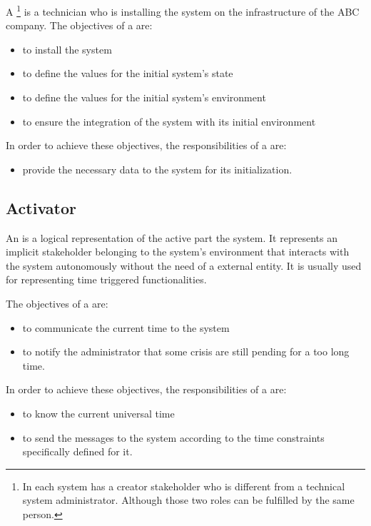 A \footnote{In \msrmessir each system has a creator stakeholder who is different from a technical system administrator. Although those two roles can be fulfilled by the same person.} is a technician who is installing the \msricrash system on the infrastructure of the ABC company.
The objectives of a  are:
\begin{itemize}
  \item to install the \msricrash system
  \item to define the values for the initial system's state
  \item to define the values for the initial system's environment
  \item to ensure the integration of the \msricrash system with its initial environment
\end{itemize}
\vspace{0.5cm}
In order to achieve these objectives, the responsibilities of a  are:
\begin{itemize}
  \item provide the necessary data to the \msricrash system for its initialization.
\end{itemize}

\subsection{Activator}

An  is a logical representation of the active part the \msricrash system. It represents an implicit stakeholder belonging to the system's environment that interacts with the \msricrash system autonomously without the need of a external entity. It is usually used for representing time triggered functionalities.

The objectives of a  are:
\begin{itemize}
  \item to communicate the current time to the system
  \item to notify the administrator that some crisis are still pending for a too long time.
\end{itemize}
\vspace{0.5cm}
In order to achieve these objectives, the responsibilities of a  are:
\begin{itemize}
  \item to know the current universal time
  \item to send the messages to the system according to the time constraints specifically defined for it.
\end{itemize}

